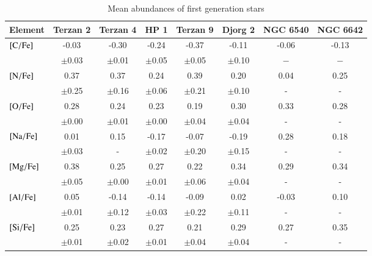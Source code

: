 \documentclass[onecolumn]{aa}
\begin{document}
\begin{table*}
	\begin{center}
		\setlength{\tabcolsep}{2.mm}  
		\caption{Mean abundances of first generation stars}
		\begin{tabular}{ l c  c c  c  c c  c   }
			\hline
			\hline
Element   & Terzan 2      &  Terzan 4       &  HP 1          &    Terzan 9       &  Djorg 2        &   NGC 6540      &   NGC 6642     \\
\hline
${\rm [C/Fe]}$   & -0.03      	  &  -0.30     	    &  -0.24         &    -0.37	  	 &  -0.11	   &   -0.06         &   -0.13        \\
& $\pm$0.03  	  &  $\pm$0.01 	    &  $\pm$0.05     &    $\pm$0.05  	 &  $\pm$0.10	   &   $-$     &   $-$    \\
${\rm [N/Fe]}$    & 0.37	  &  0.37           &  0.24          &    0.39       	 &  0.20	   &   0.04          &   0.25         \\
& $\pm$0.25  	  &  $\pm$0.16 	    &  $\pm$0.06     &    $\pm$0.21  	 &  $\pm$0.10	   &   -     &   -    \\
${\rm [O/Fe]}$    & 0.28       	  &  0.24      	    &  0.23          &    0.19       	 &  0.30       	   &   0.33          &   0.28         \\
& $\pm$0.00  	  &  $\pm$0.01 	    &  $\pm$0.00     &    $\pm$0.04  	 &  $\pm$0.04	   &   -     &   -    \\
${\rm [Na/Fe]}$   & 0.01	  &  0.15           &  -0.17         &   -0.07	  	 &  -0.19	   &   0.28          &   0.18	      \\ 
& $\pm$0.03  	  &  -	    &  $\pm$0.02     &    $\pm$0.20  	 &  $\pm$0.15	   &   -     &   -    \\
${\rm [Mg/Fe]}$   & 0.38	  &  0.25           &  0.27          &    0.22	  	 &  0.34       	   &   0.29          &   0.34	      \\ 
& $\pm$0.05  	  &  $\pm$0.00 	    &  $\pm$0.01     &    $\pm$0.06  	 &  $\pm$0.04	   &   -     &   -    \\
${\rm [Al/Fe]}$   & 0.05       	  &  -0.14      	    &  -0.14          &    -0.09       	 &  0.02	   &   -0.03          &   0.10	      \\ 
& $\pm$0.01  	  &  $\pm$0.12 	    &  $\pm$0.03     &    $\pm$0.22  	 &  $\pm$0.11	   &   -     &   -    \\
${\rm [Si/Fe]}$   & 0.25 &  0.23           &  0.27          &    0.21       	 &  0.29	   &   0.27          &   0.35         \\
& $\pm$0.01  	  &  $\pm$0.02 	    &  $\pm$0.01     &    $\pm$0.04  	 &  $\pm$0.04	   &   -     &   -    \\

\end{tabular}
\end{center}
\end{table*}
\end{document}
